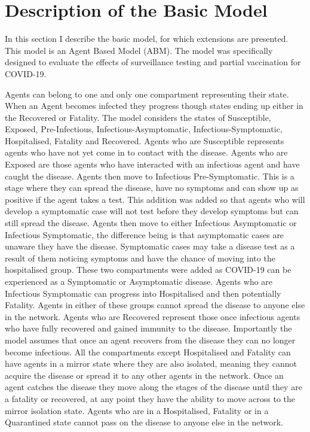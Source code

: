 \documentclass{article}
\begin{document}
\newpage
\section{Description of the Basic Model \label{description}}

In this section I describe the basic model, for which extensions are presented. 
This model is an Agent Based Model (ABM). 
The model was specifically designed to evaluate the effects of surveillance testing and partial vaccination for COVID-19.\newline

Agents can belong to one and only one compartment representing their state. 
When an Agent becomes infected they progress though states ending up either in the Recovered or Fatality. 
The model considers the states of Susceptible, Exposed, Pre-Infectious, Infectious-Asymptomatic, Infectious-Symptomatic, Hospitalised, Fatality and Recovered.
Agents who are Susceptible represents agents who have not yet come in to contact with the disease. 
Agents who are Exposed are those agents who have interacted with an infectious agent and have caught the disease.
Agents then move to Infectious Pre-Symptomatic. This is a stage where they can spread the disease, have no symptoms and can show up as positive if the agent takes a test. This addition was added so that agents who will develop a symptomatic case will not test before they develop symptoms but can still spread the disease.
Agents then move to either Infectious Asymptomatic or Infectious Symptomatic, the difference being is that asymptomatic cases are unaware they have the disease. Symptomatic cases may take a disease test as a result of them noticing symptoms and have the chance of moving into the hospitalised group. These two compartments were added as COVID-19 can be experienced as a Symptomatic or Asymptomatic disease. Agents who are Infectious Symptomatic can progress into Hospitalised and then potentially Fatality. Agents in either of these groups cannot spread the disease to anyone else in the network.
Agents who are Recovered represent those once infectious agents who have fully recovered and gained immunity to the disease. 
Importantly the model assumes that once an agent recovers from the disease they can no longer become infectious. \newline 
All the compartments except Hospitalised and Fatality can have agents in a mirror state where they are also isolated, meaning they cannot acquire the disease or spread it to any other agents in the network. Once an agent catches the disease they move along the stages of the disease until they are a fatality or recovered, at any point they have the ability to move across to the mirror isolation state. Agents who are in a Hospitalised, Fatality or in a Quarantined state cannot pass on the disease to anyone else in the network.
\end{document}

